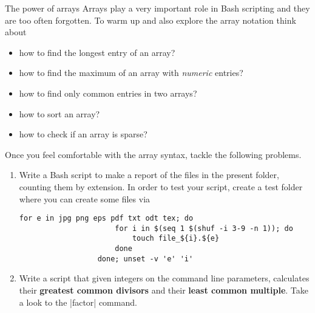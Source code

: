 
\begin{exercise}[Instructive]{The power of arrays}
    Arrays play a very important role in Bash scripting and they are too often forgotten.
    To warm up and also explore the array notation think about
    \begin{itemize}
        \item how to find the longest entry of an array?
        \item how to find the maximum of an array with \emph{numeric} entries?
        \item how to find only common entries in two arrays?
        \item how to sort an array?
        \item how to check if an array is sparse?
    \end{itemize}
    Once you feel comfortable with the array syntax, tackle the following problems.
    \begin{enumerate}[after=\vspace{-\baselineskip}]
        \item Write a Bash script to make a report of the files in the present folder, counting them by extension.
              In order to test your script, create a test folder where you can create some files via
              \begin{lstlisting}[style=MyBash]
                  for e in jpg png eps pdf txt odt tex; do
                      for i in $(seq 1 $(shuf -i 3-9 -n 1)); do
                          touch file_${i}.${e}
                      done
                  done; unset -v 'e' 'i'
              \end{lstlisting}
        \item Write a script that given integers on the command line parameters, calculates their \textbf{greatest common divisors} and their \textbf{least common multiple}.
              Take a look to the \bash|factor| command.
    \end{enumerate}
\end{exercise}
